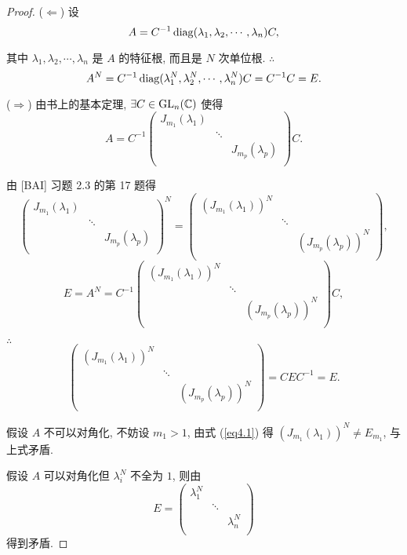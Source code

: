 \documentclass{ctexart}
\begin{document}
\begin{proof}
    ($\Leftarrow$) 设
    \[A=C^{-1}\operatorname{diag} (\lambda_1,\lambda_2,\cdots,\lambda_n)C,\]

    其中 $\lambda_1,\lambda_2,\cdots,\lambda_n$ 是 $A$ 的特征根, 而且是 $N$ 次单位根. $\therefore$
    \[A^N=C^{-1}\operatorname{diag} (\lambda_1^N,\lambda_2^N,\cdots,\lambda_n^N)C=C^{-1}C=E.\]

    ($\Rightarrow$) 由书上的基本定理, $\exists C\in\operatorname{GL} _n(\mathbb{C})$ 使得
    \[A=C^{-1}\begin{pmatrix}
        J_{m_1}(\lambda_1) \\
        & \ddots \\
        && J_{m_p}(\lambda_p) \\
    \end{pmatrix}C.\]

    由 [BAI] 习题 2.3 的第 17 题得
    \[\begin{pmatrix}
        J_{m_1}(\lambda_1) \\
        & \ddots \\
        && J_{m_p}(\lambda_p) \\
    \end{pmatrix}^N=\begin{pmatrix}
        (J_{m_1}(\lambda_1))^N \\
        & \ddots \\
        && (J_{m_p}(\lambda_p))^N \\
    \end{pmatrix},\]
    \[E=A^N=C^{-1}\begin{pmatrix}
        (J_{m_1}(\lambda_1))^N \\
        & \ddots \\
        && (J_{m_p}(\lambda_p))^N \\
    \end{pmatrix}C,\]

    $\therefore$
    \[\begin{pmatrix}
        (J_{m_1}(\lambda_1))^N \\
        & \ddots \\
        && (J_{m_p}(\lambda_p))^N \\
    \end{pmatrix}=CEC^{-1}=E.\]

    假设 $A$ 不可以对角化, 不妨设 $m_1>1$, 由式 (\ref{eq4.1}) 得 $(J_{m_1}(\lambda_1))^N\neq E_{m_1}$, 与上式矛盾.

    假设 $A$ 可以对角化但 $\lambda_i^N$ 不全为 $1$, 则由
    \[E=\begin{pmatrix}
        \lambda_1^N \\
        & \ddots \\
        && \lambda_n^N \\
    \end{pmatrix}\]
    得到矛盾.
\end{proof}
\end{document}
